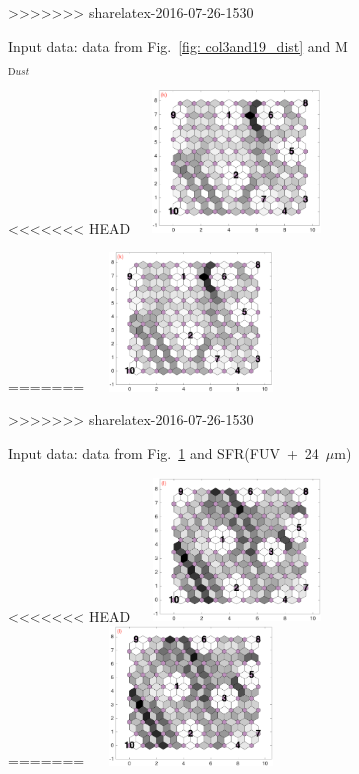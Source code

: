 \begin{figure}
\begin{subfigure}[b]{0.25\textwidth}
>>>>>>> sharelatex-2016-07-26-1530
          \caption{Input data: data from Fig.~\ref{fig: col3and19_dist} and M$_{{\mathrm Dust}}$}
        \label{fig: col3and20_dist}
    \end{subfigure}        \hfill
    \begin{subfigure}[b]{0.25\textwidth}
        \centering
<<<<<<< HEAD
        \includegraphics[width=54mm, height=38mm]{../../images0.01/M31/2D/diff_dimension/combine_2D_data_between_cols3and21.png}
        \caption{Input data: data from Fig.~\ref{fig: col3and20_dist} and SFR}
=======
        \includegraphics[width=54mm, height=37mm]{../../images0.01/M31/2D/diff_dimension/combine_2D_data_between_cols3and21.png}
        \caption{Input data: data from Fig.~\ref{fig: col3and20_dist} and SFR(FUV\ +\ 24\ $\mu$m)}
>>>>>>> sharelatex-2016-07-26-1530
        \label{fig: col3and21_dist}
    \end{subfigure}
            \hfill
    \begin{subfigure}[b]{0.25\textwidth}
        \centering
<<<<<<< HEAD
        \includegraphics[width=54mm, height=38mm]{../../images0.01/M31/2D/diff_dimension/combine_2D_data_between_cols3and22.png}
=======
        \includegraphics[width=54mm, height=37mm]{../../images0.01/M31/2D/diff_dimension/combine_2D_data_between_cols3and22.png}

\end{subfigure}
\end{figure}
